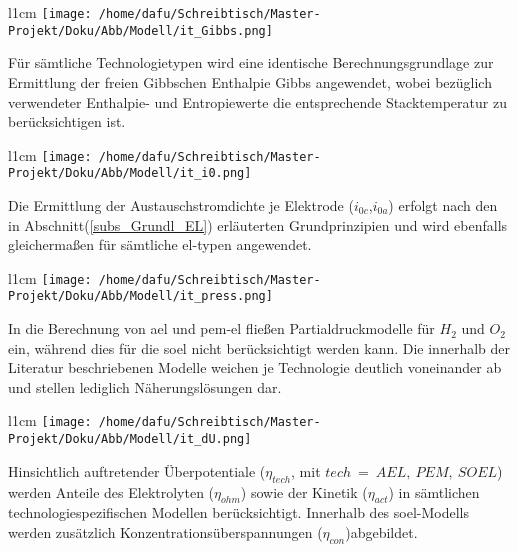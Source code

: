 \documentclass[onecolumn,10pt,titlepage]{article}
\begin{document}
\begin{wrapfigure}{l}{1cm}
	\texttt{[image: /home/dafu/Schreibtisch/Master-Projekt/Doku/Abb/Modell/it\_Gibbs.png]}
\end{wrapfigure}
Für sämtliche Technologietypen wird eine identische Berechnungsgrundlage zur Ermittlung der freien Gibbschen Enthalpie %
\gls{Gibbs} angewendet, wobei bezüglich verwendeter Enthalpie- und Entropiewerte die entsprechende Stacktemperatur  zu berücksichtigen ist.\\
\begin{wrapfigure}{l}{1cm}
	\texttt{[image: /home/dafu/Schreibtisch/Master-Projekt/Doku/Abb/Modell/it\_i0.png]}
\end{wrapfigure}
Die Ermittlung der Austauschstromdichte je Elektrode ($i_{0c}$,$i_{0a}$) erfolgt  nach den in Abschnitt(\ref{subs_Grundl_EL}) erläuterten Grundprinzipien und wird ebenfalls gleichermaßen für sämtliche \gls{el}-typen angewendet.
\newline

\begin{wrapfigure}{l}{1cm}
	\texttt{[image: /home/dafu/Schreibtisch/Master-Projekt/Doku/Abb/Modell/it\_press.png]}
\end{wrapfigure}
 In die Berechnung von \gls{ael} und \gls{pem}-\gls{el} fließen Partialdruckmodelle für $H_2$ und $O_2$ ein, während dies für die \gls{soel} nicht berücksichtigt werden kann. Die innerhalb der Literatur beschriebenen Modelle weichen je Technologie deutlich voneinander ab und stellen lediglich Näherungslösungen dar.\\
\newline

\begin{wrapfigure}{l}{1cm}
	\texttt{[image: /home/dafu/Schreibtisch/Master-Projekt/Doku/Abb/Modell/it\_dU.png]}
\end{wrapfigure} 
Hinsichtlich auftretender Überpotentiale ($\eta_{tech}$, mit $tech ~=~AEL,~PEM,~SOEL$) werden Anteile des Elektrolyten ($\eta_{ohm}$) sowie der Kinetik ($\eta_{act}$) in sämtlichen technologiespezifischen Modellen berücksichtigt. Innerhalb des \gls{soel}-Modells werden zusätzlich Konzentrationsüberspannungen ($\eta_{con}$)abgebildet.\\
\newline
\end{document}
